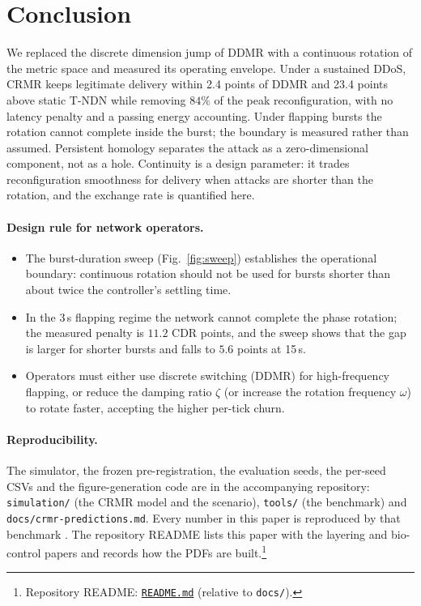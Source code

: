 \documentclass[10pt,a4paper]{article}
\begin{document}
\section{Conclusion}
\label{sec:conclusion}

We replaced the discrete dimension jump of DDMR with a continuous rotation of the
metric space and measured its operating envelope. Under a sustained DDoS, CRMR
keeps legitimate delivery within 2.4 points of DDMR and 23.4 points above static
T-NDN while removing $84\%$ of the peak reconfiguration, with no latency penalty
and a passing energy accounting. Under flapping bursts the rotation cannot complete
inside the burst; the boundary is measured rather than assumed. Persistent homology
separates the attack as a zero-dimensional component, not as a hole. Continuity is
a design parameter: it trades reconfiguration smoothness for delivery when attacks
are shorter than the rotation, and the exchange rate is quantified here.

\paragraph{Design rule for network operators.}
\begin{itemize}
\item The burst-duration sweep (Fig.~\ref{fig:sweep}) establishes the operational
boundary: continuous rotation should not be used for bursts shorter than about
twice the controller's settling time.
\item In the 3\,s flapping regime the network cannot complete the phase rotation;
the measured penalty is $11.2$ CDR points, and the sweep shows that the gap is
larger for shorter bursts and falls to $5.6$ points at 15\,s.
\item Operators must either use discrete switching (DDMR) for high-frequency
flapping, or reduce the damping ratio $\zeta$ (or increase the rotation frequency
$\omega$) to rotate faster, accepting the higher per-tick churn.
\end{itemize}

\paragraph{Reproducibility.}
The simulator, the frozen pre-registration, the evaluation seeds, the per-seed
CSVs and the figure-generation code are in the accompanying repository:
\texttt{simulation/} (the CRMR model and the scenario), \texttt{tools/} (the
benchmark) and \texttt{docs/crmr-predictions.md}. Every number in this paper is
reproduced by that benchmark \cite{repo}. The repository README lists this paper with the
layering and bio-control papers and records how the PDFs are built.\footnote{%
Repository README: \href{../README.md}{\texttt{README.md}} (relative to
\texttt{docs/}).}
\end{document}
